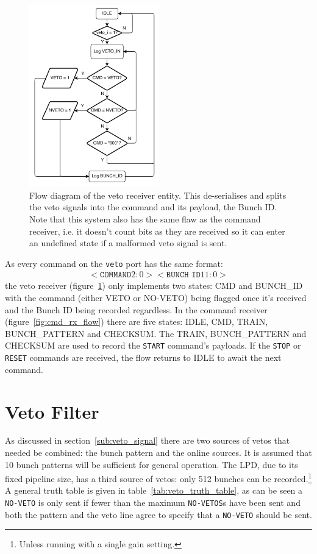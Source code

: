 \begin{figure}[htbp]
  \centering
  \includegraphics[width=0.5\textwidth]{images/pdfs/veto_rx_flow.pdf}
  \caption{Flow diagram of the veto receiver entity. This de-serialises and splits the veto signals into the command and its payload, the Bunch ID. Note that this system also has the same flaw as the command receiver, i.e. it doesn't count bits as they are received so it can enter an undefined state if a malformed veto signal is sent.}
  \label{fig:veto_rx_flow}
\end{figure}

As every command on the \texttt{veto} port has the same format:
\begin{align}
  <\texttt{COMMAND} 2:0><\texttt{BUNCH~ID} 11:0>
\end{align}
the veto receiver (figure~\ref{fig:veto_rx_flow}) only implements two states: CMD and BUNCH\_ID with the command (either VETO or NO-VETO) being flagged once it's received and the Bunch ID being recorded regardless. In the command receiver (figure~\ref{fig:cmd_rx_flow}) there are five states: IDLE, CMD, TRAIN, BUNCH\_PATTERN and CHECKSUM. The TRAIN, BUNCH\_PATTERN and CHECKSUM are used to record the \texttt{START} command's payloads. If the \texttt{STOP} or \texttt{RESET} commands are received, the flow returns to IDLE to await the next command. 
\section{Veto Filter} %
\label{sec:veto_filter}
As discussed in section~\ref{sub:veto_signal} there are two sources of vetos that needed be combined: the bunch pattern and the online sources. It is assumed that 10 bunch patterns will be sufficient for general operation. The LPD, due to its fixed pipeline size, has a third source of vetos: only 512 bunches can be recorded.\footnote{Unless running with a single gain setting.} A general truth table is given in table~\ref{tab:veto_truth_table}, as can be seen a \texttt{NO-VETO} is only sent if fewer than the maximum \texttt{NO-VETOS}s have been sent and both the pattern and the veto line agree to specify that a \texttt{NO-VETO} should be sent.
    
